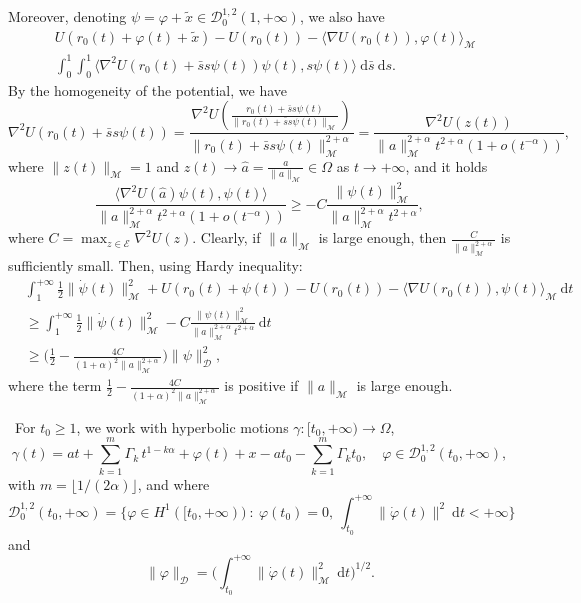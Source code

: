 \documentclass[a4paper,10pt]{amsart}
\newcommand{\ud}{\mathrm{d}}
\theoremstyle{plain}
\theoremstyle{definition}
\numberwithin{equation}{section}
\numberwithin{thm}{section}
\begin{document}
Moreover, 
denoting $\psi=\varphi + \tilde x\in\mathcal{D}_0^{1,2}(1,+\infty)$, we also have
\[
\begin{split}
&U(r_0(t) + \varphi(t) + \tilde x) - U(r_0(t))  - \langle\nabla U(r_0(t)) ,\varphi(t)\rangle_\mathcal{M}\\
& \int_{0}^{1}\int_{0}^{1} \langle\nabla^2 U (r_0(t) + \bar s s\psi(t))\psi(t),s\psi(t)\rangle\ \ud \bar s\ \ud s.
\end{split}
\]
By the homogeneity of the potential, we have
\[
\nabla^2 U (r_0(t) + \bar s s\psi(t)) = \frac{\nabla^2 U (\frac{r_0(t) + \bar s s\psi(t)}{\|r_0(t) + \bar s s\psi(t)\|_\mathcal{M}})}{\|r_0(t) + \bar s s\psi(t)\|_\mathcal{M}^{2+\alpha}} = \frac{\nabla^2 U(z(t))}{\|a\|_\mathcal{M}^{2+\alpha}t^{2+\alpha}(1 + o(t^{-\alpha}))},
\]
where $\|z(t)\|_{\mathcal M}=1$ and $z(t)\rightarrow \hat a = \frac{a}{\|a\|_\mathcal{M}}\in\Omega$ as $t\rightarrow+\infty$, and it holds
\[
\frac{\langle\nabla^2 U(\hat a)\psi(t),\psi(t)\rangle}{\|a\|_\mathcal{M}^{2+\alpha}t^{2+\alpha}(1 + o(t^{-\alpha}))} \ge -C\frac{\|\psi(t)\|_\mathcal{M}^2}{\|a\|_\mathcal{M}^{2+\alpha}t^{2+\alpha}},
\]
where $C=\max_{z\in\mathcal
E}\nabla^2 U(z)$. Clearly, if $\|a\|_\mathcal{M}$ is large enough, then $\frac{C}{\|a\|_\mathcal{M}^{2+\alpha}}$ is sufficiently small. Then, using Hardy inequality:
\[
\begin{split}
&\int_{1}^{+\infty}\frac{1}{2}\|\dot\psi(t)\|_\mathcal{M}^2 + U(r_0(t) + \psi(t)) - U(r_0(t))  - \langle\nabla U(r_0(t)) ,\psi(t)\rangle_\mathcal{M}\ \ud t\\
& \ge \int_{1}^{+\infty}\frac{1}{2}\|\dot\psi(t)\|_\mathcal{M}^2 -C\frac{\|\psi(t)\|_\mathcal{M}^2}{\|a\|_\mathcal{M}^{2+\alpha}t^{2+\alpha}}\ \ud t\\
& \ge  \bigg( \frac{1}{2} -  \frac{4C}{(1+\alpha)^2\|a\|_\mathcal{M}^{2+\alpha}}\bigg)\|\psi\|_\mathcal{D}^2,
\end{split}
\]
where the term $\frac{1}{2} -  \frac{4C}{(1+\alpha)^2\|a\|_\mathcal{M}^{2+\alpha}}$ is positive if $\|a\|_\mathcal{M}$ is large enough.
 

\smallskip
{} \ For $t_0\ge1$, we work with hyperbolic motions $\gamma:[t_0,+\infty)\rightarrow\Omega$,
\[
\gamma(t) = at +\sum_{k=1}^{m}\Gamma_k\,t^{1-k\alpha}+ \varphi(t) + x - a t_0 - \sum_{k=1}^{m}\Gamma_k t_0,\quad \varphi\in\mathcal{D}_0^{1,2}(t_0,+\infty),
\]
with $m=\lfloor 1/(2\alpha)\rfloor$, and where
\[
\mathcal{D}_0^{1,2}(t_0,+\infty) = \{\varphi\in H^1([t_0,+\infty))\ :\ \varphi(t_0)=0,\ \int_{t_0}^{+\infty}\|\dot\varphi(t)\|^2\ \ud t < +\infty\}
\]
and 
\[
\|\varphi\|_\mathcal{D} = \bigg(\int_{t_0}^{+\infty}\|\dot\varphi(t)\|_\mathcal{M}^2\ \ud t\bigg)^{1/2}.
\]
\end{document}
